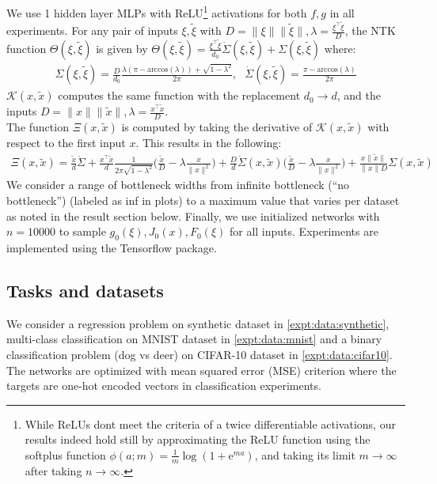 \documentclass{article}
\theoremstyle{definition}
\theoremstyle{remark}
\renewcommand{\[}{\begin{eqnarray}}
\renewcommand{\]}{\end{eqnarray}}
\renewcommand{\[}{\begin{eqnarray}}
\renewcommand{\]}{\end{eqnarray}}
\begin{document}
We use 1 hidden layer MLPs with ReLU\footnote{While ReLUs dont meet the criteria of a twice differentiable activations, our results indeed hold still by approximating the ReLU function using the softplus function $\phi(a;m) = \frac{1}{m}\log(1 + \text{e}^{ma})$, and taking its limit $m \to \infty$ after taking $n \to \infty$.} activations for both $f,g$ in all experiments. For any pair of inputs $\xi,\tilde{\xi}$ with $D = \|\xi\|\|\tilde{\xi}\|, \lambda = \frac{\xi^\top \tilde{\xi}}{D}$, the NTK function $\Theta(\xi,\tilde{\xi})$ is given by $\Theta(\xi,\tilde{\xi}) = \frac{\xi^\top\tilde{\xi}}{d_0}\dot{\Sigma}(\xi,\tilde{\xi}) + \Sigma(\xi,\tilde{\xi})$
where:
\begin{align}
    \Sigma(\xi,\tilde{\xi}) = \frac{D}{d_0}\frac{\lambda(\pi - \text{arccos}(\lambda)) + \sqrt{1 - \lambda^2}}{2\pi},~~~
    \dot{\Sigma}(\xi,\tilde{\xi}) = \frac{\pi - \text{arccos}(\lambda)}{2\pi}
\end{align}
$\mathcal{K}(x,\tilde{x})$ computes the same function with the replacement $d_0 \to d$, and the inputs $D = \|x\|\|\tilde{x}\|, \lambda = \frac{x^\top \tilde{x}}{D}$.\\
The function $\Xi(x,\tilde{x})$ is computed by taking the derivative of $\mathcal{K}(x,\tilde{x})$ with respect to the first input $x$. This results in the following:
\begin{align}
    \Xi(x,\tilde{x}) = \frac{\tilde{x}}{d}\dot{\Sigma} + \frac{x^\top \tilde{x}}{d}\frac{1}{2\pi\sqrt{1 - \lambda^2}}\big(\frac{\tilde{x}}{D} - \lambda \frac{x}{\|x\|^2}\big) + \frac{D}{d}\dot{\Sigma}(x,\tilde{x})\big(\frac{\tilde{x}}{D} - \lambda \frac{x}{\|x\|^2}\big) + \frac{x\|\tilde{x}\|}{\|x\|D}\Sigma(x,\tilde{x})
\end{align}
We consider a range of bottleneck widths from infinite bottleneck (``no bottleneck'') (labeled as inf in plots) to a maximum value that varies per dataset as noted in the result section below. Finally, we use initialized networks with $n = 10000$ to sample $g_{0}(\xi), J_0(x), F_0(\xi)$ for all inputs. Experiments are implemented using the Tensorflow \cite{tensorflow2015-whitepaper} package.

\subsection{Tasks and datasets}

We consider a regression problem on synthetic dataset in \cref{expt:data:synthetic}, multi-class classification on MNIST dataset \cite{mnist} in \cref{expt:data:mnist} and a binary classification problem (dog vs deer) on CIFAR-10 dataset \cite{cifar} in \cref{expt:data:cifar10}. The networks are optimized with mean squared error (MSE) criterion where the targets are one-hot encoded vectors in classification experiments. 
\end{document}
